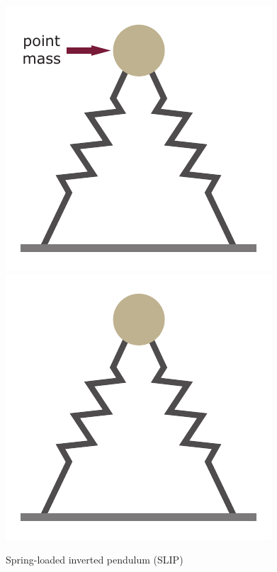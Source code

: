 \documentclass[10pt]{beamer}
\begin{document}
\begin{frame}
\begin{columns}
\begin{figure}
\begin{overprint}
				\includegraphics[width=.9\textwidth]{images/slip/double_SLIP_mass.pdf}
				\onslide<4->\includegraphics[width=.9\textwidth]{images/slip/double_SLIP.pdf}		
			\end{overprint}			
			\caption{Spring-loaded inverted pendulum (SLIP)}
		\end{figure}
	

\end{columns}
\end{frame}
\end{document}
